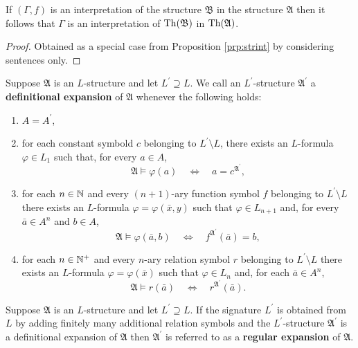 \begin{cor}
	If $(\Gamma,f)$ is an interpretation of the structure $\mathfrak{B}$ in the structure $\mathfrak{A}$ then it follows that $\Gamma$ is an interpretation of $\operatorname{Th}(\mathfrak{B})$ in $\operatorname{Th}(\mathfrak{A})$.
\end{cor}
\begin{proof}
	Obtained as a special case from Proposition \ref{prp:strint} by considering sentences only.
\end{proof}

\begin{dfn}
	Suppose $\mathfrak{A}$ is an $L$-structure and let $L^\prime\supseteq L$.  We call an $L^\prime$-structure $\mathfrak{A}^\prime$ a \textbf{definitional expansion} of $\mathfrak{A}$ whenever the following holds:
	\begin{enumerate}
		\item	$A=A^\prime$,
		\item	for each constant symbold $c$ belonging to $L^\prime\setminus L$, there exists an $L$-formula $\varphi\in L_1$ such that, for every $a\in A$,
			\begin{equation}
				\mathfrak{A}\models\varphi(a)\quad\iff\quad a=c^{\mathfrak{A}^\prime},
			\end{equation}
		\item	for each $n\in\mathbb{N}$ and every $(n+1)$-ary function symbol $f$ belonging to $L^\prime\setminus L$ there exists an $L$-formula $\varphi=\varphi(\bar{x},y)$ such that $\varphi\in L_{n+1}$ and, for every $\bar{a}\in A^n$ and $b\in A$,
			\begin{equation}
				\mathfrak{A}\models\varphi(\bar{a},b)\quad\iff\quad f^{\mathfrak{A}^\prime}(\bar{a})=b,
			\end{equation}
		\item	for each $n\in\mathbb{N}^{+}$ and every $n$-ary relation symbol $r$ belonging to $L^\prime\setminus L$ there exists an $L$-formula $\varphi=\varphi(\bar{x})$ such that $\varphi\in L_n$ and, for each $\bar{a}\in A^n$,
			\begin{equation}
				\mathfrak{A}\models r(\bar{a})\quad\iff\quad r^{\mathfrak{A}^\prime}(\bar{a}).
			\end{equation}
	\end{enumerate}
\end{dfn}

\begin{dfn}
	Suppose $\mathfrak{A}$ is an $L$-structure and let $L^\prime\supseteq L$.  If the signature $L^\prime$ is obtained from $L$ by adding finitely many additional relation symbols and the $L^\prime$-structure $\mathfrak{A}^\prime$ is a definitional expansion of $\mathfrak{A}$ then $\mathfrak{A}^\prime$ is referred to as a \textbf{regular expansion} of $\mathfrak{A}$.
\end{dfn}

